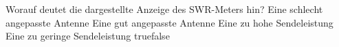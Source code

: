     {Worauf deutet die dargestellte Anzeige des SWR-Meters hin?}
    {Eine schlecht angepasste Antenne}
    {Eine gut angepasste Antenne}
    {Eine zu hohe Sendeleistung}
    {Eine zu geringe Sendeleistung}
    {true}{false}